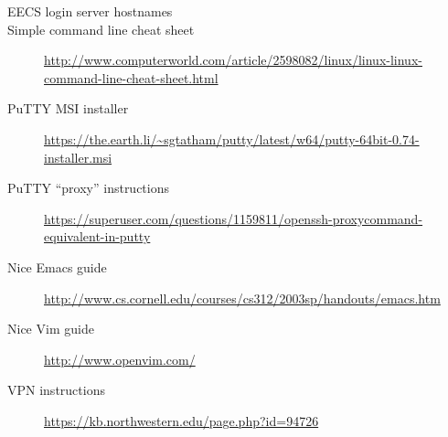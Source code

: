 \documentclass{tufte-handout}
\def\PuTTYurl{https://the.earth.li/~sgtatham/putty/latest/w64/putty-64bit-0.74-installer.msi}
\def\GlobalProtectUrl{https://kb.northwestern.edu/page.php?id=94726}
\def\PuTTYhelpUrl{https://superuser.com/questions/1159811/openssh-proxycommand-equivalent-in-putty}
\begin{document}
\begin{description}

\item[EECS login server hostnames]
\LabHostnamesLink

\item[Simple command line cheat sheet]
\url{http://www.computerworld.com/article/2598082/linux/linux-linux-command-line-cheat-sheet.html}

\item[PuTTY MSI installer]
\url{\PuTTYurl}

\item[PuTTY ``proxy'' instructions]
\url{\PuTTYhelpUrl}

\item[Nice Emacs guide]
\url{http://www.cs.cornell.edu/courses/cs312/2003sp/handouts/emacs.htm}

\item[Nice Vim guide]
\url{http://www.openvim.com/}

\item[VPN instructions]
\url{\GlobalProtectUrl}

\end{description}
\end{document}
